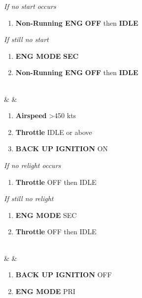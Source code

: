 \documentclass[fontInter]{TechCheck}
\begin{document}
\begin{listlongtable}
\begin{minipage}[t]{\linewidth}
			\emph{If no start occurs}
			\begin{enumerate}[resume]
				\vspace{-7pt}
				\item \textbf{Non-Running ENG} \dotfill \textbf{OFF} then \textbf{IDLE}
			\end{enumerate}
			\emph{If still no start}
			\begin{enumerate}[resume]
				\vspace{-7pt}
				\item \textbf{ENG MODE} \dotfill \textbf{SEC}
				\item \textbf{Non-Running ENG} \dotfill \textbf{OFF} then \textbf{IDLE}
			\end{enumerate}
		\end{minipage} \\
		\midrule
		\textbf{\textbf{\textbullet}} &  &
		\begin{minipage}[t]{\linewidth}
			\vspace{-7pt}
			\begin{enumerate}
				\item \textbf{Airspeed} \dotfill >450 kts
				\item \textbf{Throttle} \dotfill IDLE or above
				\item \textbf{BACK UP IGNITION} \dotfill ON
			\end{enumerate}
			\emph{If no relight occurs}
			\begin{enumerate}[resume]
				\vspace{-7pt}
				\item \textbf{Throttle} \dotfill OFF then IDLE
			\end{enumerate}
			\emph{If still no relight}
			\begin{enumerate}[resume]
				\vspace{-7pt}
				\item \textbf{ENG MODE} \dotfill SEC
				\item \textbf{Throttle} \dotfill OFF then IDLE
			\end{enumerate}
		\end{minipage} \\
		\midrule
		\textbf{\textbf{\textbullet}} &  &
		\begin{minipage}[t]{\linewidth}
			\vspace{-7pt}
			\begin{enumerate}
				\item \textbf{BACK UP IGNITION} \dotfill OFF
				\item \textbf{ENG MODE} \dotfill PRI
			\end{enumerate}
		\end{minipage} \\
	\end{listlongtable}
\end{document}
